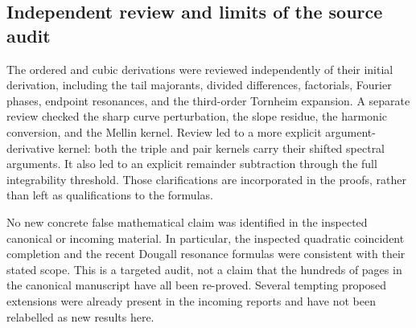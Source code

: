\documentclass[11pt,letterpaper]{article}
\numberwithin{equation}{section}
\theoremstyle{definition}
\theoremstyle{remark}
\begin{document}
\subsection{Independent review and limits of the source audit}

The ordered and cubic derivations were reviewed independently of
their initial derivation, including the tail majorants, divided
differences, factorials, Fourier phases, endpoint resonances, and the
third-order Tornheim expansion. A separate review checked the sharp
curve perturbation, the slope residue, the harmonic conversion, and
the Mellin kernel. Review led to a more explicit argument-derivative
kernel: both the triple and pair kernels carry their shifted spectral
arguments. It also led to an explicit remainder subtraction through
the full integrability threshold. Those clarifications are incorporated
in the proofs, rather than left as qualifications to the formulas.

No new concrete false mathematical claim was identified in the
inspected canonical or incoming material. In particular, the inspected
quadratic coincident completion and the recent Dougall resonance
formulas were consistent with their stated scope. This is a targeted
audit, not a claim that the hundreds of pages in the canonical
manuscript have all been re-proved. Several tempting proposed
extensions were already present in the incoming reports and have not
been relabelled as new results here.
\end{document}
